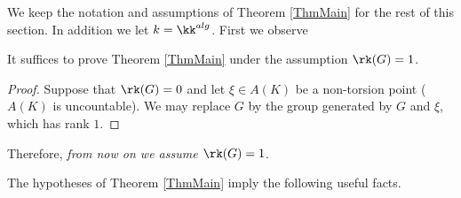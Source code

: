 We keep the notation and assumptions of Theorem \ref{ThmMain} for the rest of this section. In addition we let $k=\kk^{alg}$. First we observe

\begin{lemma}
\notready\label{LemmaRk1} It suffices to prove Theorem \ref{ThmMain} under the assumption $\rk(G)=1$.
\end{lemma}
\begin{proof} Suppose that $\rk(G)=0$ and let $\xi\in A(K)$ be a non-torsion point ($A(K)$ is uncountable). We may replace $G$ by the group generated by $G$ and $\xi$, which has rank $1$.
\end{proof}

Therefore, \emph{from now on we assume $\rk(G)=1$.}




The hypotheses of Theorem \ref{ThmMain} imply the following useful facts.

